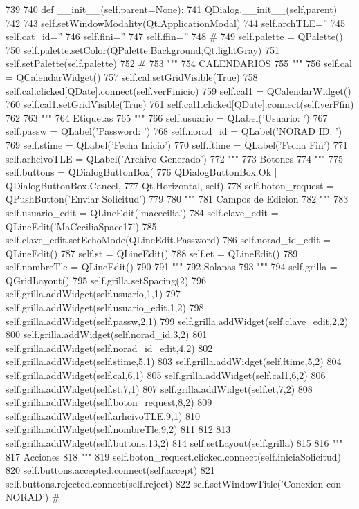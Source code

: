\begin{DoxyCode}
739 
740     def __init__(self,parent=None):
741         QDialog.__init__(self,parent)
742 
743         self.setWindowModality(Qt.ApplicationModal)
744         self.archTLE=''
745         self.cat_id=''
746         self.fini=''
747         self.ffin=''
748 #         
749         self.palette = QPalette()
750         self.palette.setColor(QPalette.Background,Qt.lightGray)
751         self.setPalette(self.palette)
752 #         
753         """
754         CALENDARIOS
755         """
756         self.cal = QCalendarWidget()
757         self.cal.setGridVisible(True)
758         self.cal.clicked[QDate].connect(self.verFinicio)
759         self.cal1 = QCalendarWidget()
760         self.cal1.setGridVisible(True)
761         self.cal1.clicked[QDate].connect(self.verFfin)
762          
763         """
764         Etiquetas
765         """
766         self.usuario    = QLabel('Usuario: ')
767         self.passw      = QLabel('Password: ')
768         self.norad_id   = QLabel('NORAD ID: ')
769         self.stime      = QLabel('Fecha Inicio')
770         self.ftime      = QLabel('Fecha Fin')
771         self.arhcivoTLE = QLabel('Archivo Generado')
772         """
773         Botones
774         """
775         self.buttons = QDialogButtonBox(
776             QDialogButtonBox.Ok | QDialogButtonBox.Cancel,
777             Qt.Horizontal, self)
778         self.boton_request = QPushButton('Enviar Solicitud')
779 
780         """
781         Campos de Edicion
782         """
783         self.usuario_edit  = QLineEdit('macecilia')
784         self.clave_edit    = QLineEdit('MaCeciliaSpace17')
785         self.clave_edit.setEchoMode(QLineEdit.Password)
786         self.norad_id_edit = QLineEdit()
787         self.st            = QLineEdit()
788         self.et            = QLineEdit()
789         self.nombreTle     = QLineEdit()
790 
791         """
792         Solapas
793         """        
794         self.grilla = QGridLayout()
795         self.grilla.setSpacing(2)
796         self.grilla.addWidget(self.usuario,1,1)
797         self.grilla.addWidget(self.usuario_edit,1,2)
798         self.grilla.addWidget(self.passw,2,1)
799         self.grilla.addWidget(self.clave_edit,2,2)
800         self.grilla.addWidget(self.norad_id,3,2)
801         self.grilla.addWidget(self.norad_id_edit,4,2)
802         self.grilla.addWidget(self.stime,5,1)
803         self.grilla.addWidget(self.ftime,5,2)
804         self.grilla.addWidget(self.cal,6,1)
805         self.grilla.addWidget(self.cal1,6,2)
806         self.grilla.addWidget(self.st,7,1)
807         self.grilla.addWidget(self.et,7,2)
808         self.grilla.addWidget(self.boton_request,8,2)
809         self.grilla.addWidget(self.arhcivoTLE,9,1)
810         self.grilla.addWidget(self.nombreTle,9,2)
811         
812 
813         self.grilla.addWidget(self.buttons,13,2) 
814         self.setLayout(self.grilla) 
815         
816         """
817         Acciones
818         """
819         self.boton_request.clicked.connect(self.iniciaSolicitud)
820         self.buttons.accepted.connect(self.accept)
821         self.buttons.rejected.connect(self.reject)  
822         self.setWindowTitle('Conexion con NORAD')
#         
\end{DoxyCode}
